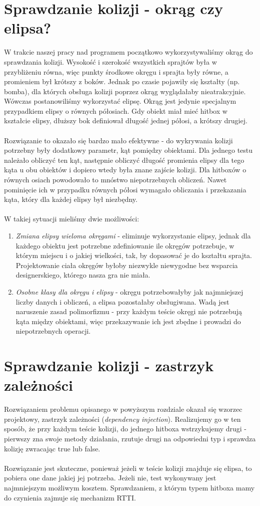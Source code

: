 \documentclass[a4paper,twoside]{article}
\begin{document}
		\section{Sprawdzanie kolizji - okrąg czy elipsa?}
			W trakcie naszej pracy nad programem początkowo wykorzystywaliśmy okrąg do sprawdzania kolizji. Wysokość i szerokość wszystkich sprajtów była w przybliżeniu równa, więc punkty środkowe okręgu i sprajta były równe, a promieniem był krótszy z boków. Jednak po czasie pojawiły się kształty (np. bomba), dla których obsługa kolizji poprzez okrąg wyglądałaby nieatrakcyjnie. Wówczas postanowiliśmy wykorzystać elipsę. Okrąg jest jedynie specjalnym przypadkiem elipsy o równych półosiach. Gdy obiekt miał mieć hitbox w kształcie elipsy, dłuższy bok definiował długość jednej półosi, a krótszy drugiej.\\\\
			Rozwiązanie to okazało się bardzo mało efektywne - do wykrywania kolizji potrzebny były dodatkowy parametr, kąt pomiędzy obiektami. Dla jednego testu należało obliczyć ten kąt, następnie obliczyć długość promienia elipsy dla tego kąta u obu obiektów i dopiero wtedy była znane zajście kolizji. Dla hitboxów o równych osiach powodowało to mnóstwo niepotrzebnych obliczeń. Nawet pominięcie ich w przypadku równych półosi wymagało obliczania i przekazania kąta, który dla każdej elipsy był niezbędny.\\\\
			W takiej sytuacji mieliśmy dwie możliwości:
			\begin{enumerate}
				\item \textit{Zmiana elipsy wieloma okręgami} - eliminuje wykorzystanie elipsy, jednak dla każdego obiektu jest potrzebne zdefiniowanie ile okręgów potrzebuje, w którym miejscu i o jakiej wielkości, tak, by dopasować je do kształtu sprajta. Projektowanie ciała okręgów byłoby niezwykle niewygodne bez wsparcia designerskiego, którego nasza gra nie miała. 
				\item \textit{Osobne klasy dla okręgu i elipsy} - okręgu potrzebowałyby jak najmniejszej liczby danych i obliczeń, a elipsa pozostałaby obsługiwana. Wadą jest naruszenie zasad polimorfizmu - przy każdym teście okręgi nie potrzebują kąta między obiektami, więc przekazywanie ich jest zbędne i prowadzi do niepotrzebnych operacji.
			\end{enumerate}
		\section{Sprawdzanie kolizji - zastrzyk zależności}
			Rozwiązaniem problemu opisanego w powyższym rozdziale okazał się wzorzec projektowy, zastrzyk zależności (\emph{dependency injection}). Realizujemy go w ten sposób, że przy każdym teście kolizji, do jednego hitboxa wstrzykujemy drugi - pierwszy zna swoje metody działania, rzutuje drugi na odpowiedni typ i sprawdza kolizję zwracając true lub false.\\\\
			Rozwiązanie jest skuteczne, ponieważ jeżeli w teście kolizji znajduje się elipsa, to pobiera one dane jakiej jej potrzeba. Jeżeli nie, test wykonywany jest najmniejszym możliwym kosztem. Sprawdzaniem, z którym typem hitboxa mamy do czynienia zajmuje się mechanizm RTTI.
	
\end{document}
